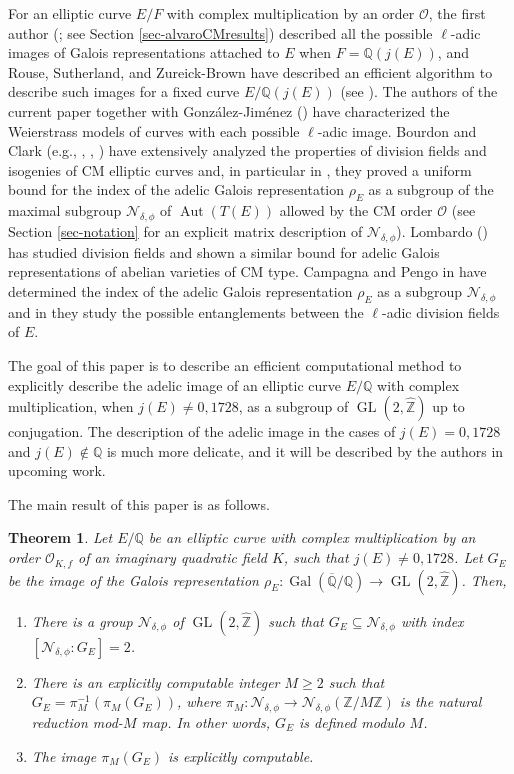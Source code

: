 \documentclass[11pt]{amsart}
\newtheorem{thm}[defn]{Theorem}
\theoremstyle{definition}
\newcommand{\Q}{\mathbb{Q}}
\newcommand{\Z}{\mathbb{Z}}
\newcommand{\Of}{\mathcal{O}_{K,f}}
\newcommand{\OO}{\mathcal{O}}
\newcommand{\Rats}{\mathbb{Q}}
\newcommand{\Gal}{\operatorname{Gal}}
\newcommand{\Aut}{\operatorname{Aut}}
\newcommand{\GQ}{\Gal(\overline{\Rats}/\Rats)}
\newcommand{\GL}{\operatorname{GL}}
\begin{document}
For an elliptic curve $E/F$ with complex multiplication by an order $\OO$, the first author (\cite{lozano-galoiscm}; see Section \ref{sec-alvaroCMresults}) described all the possible $\ell$-adic images of Galois representations attached to $E$ when $F=\Q(j(E))$, and  Rouse, Sutherland, and Zureick-Brown have described an efficient algorithm to describe such images for a fixed curve $E/\Q(j(E))$ (see \cite[Section 12]{elladic}). The authors of the current paper together with Gonz\'alez-Jim\'enez (\cite{modelspaper}) have characterized the Weierstrass models of curves with each possible $\ell$-adic image. Bourdon and Clark (e.g., \cite{bourdon2},
\cite{bourdon}, \cite{bourdon4}) have extensively analyzed the properties of division fields and isogenies of CM elliptic curves and, in particular in  \cite[Cor. 1.5]{bourdon2}, they proved a uniform bound for the  index of the adelic Galois representation $\rho_E$ as a subgroup of the maximal subgroup $\mathcal{N}_{\delta,\phi}$ of $\Aut(T(E))$ allowed by the CM order $\OO$ (see Section \ref{sec-notation} for an explicit matrix description of $\mathcal{N}_{\delta,\phi}$). Lombardo (\cite{lombardo}) has studied division fields and shown a similar bound for adelic Galois representations of abelian varieties of CM type. Campagna and Pengo in \cite{CampagnaPengo2}  have determined the index of the adelic Galois representation $\rho_E$ as a subgroup  $\mathcal{N}_{\delta,\phi}$   and in \cite{CampagnaPengo1}  they study the possible entanglements between the $\ell$-adic division fields of $E$. 

The goal of this paper is to describe an efficient computational method to explicitly describe the adelic image of an elliptic curve $E/\Q$ with complex multiplication, when $j(E)\neq 0,1728$, as a subgroup of $\GL(2,\widehat{\Z})$ up to conjugation. The description of the adelic image in the cases of $j(E)=0,1728$ and $j(E)\not\in\Q$ is much more delicate, and it will be described by the authors in upcoming work. 

The main result of this paper is as follows.

\begin{thm}\label{main-result}
    Let $E/\Q$ be an elliptic curve with complex multiplication by an order $\Of$ of an imaginary quadratic field $K$, such that $j(E)\neq 0,1728$. Let $G_E$ be the image of the Galois representation $\rho_E\colon \GQ\to \GL(2,\widehat{\Z})$. Then,
    \begin{enumerate}
        \item There is a group $\mathcal{N}_{\delta,\phi}$ of $\GL(2,\widehat{\Z})$ such that $G_E\subseteq\mathcal{N}_{\delta,\phi}$ with index $[\mathcal{N}_{\delta,\phi}:G_E]=2$. 
        \item There is an explicitly computable integer $M\geq 2$ such that $G_E=\pi_M^{-1}(\pi_M(G_E))$, where $\pi_M\colon \mathcal{N}_{\delta,\phi}\to \mathcal{N}_{\delta,\phi}(\Z/M\Z)$ is the natural reduction mod-$M$ map. In other words, $G_E$ is defined modulo $M$.
        \item The image $\pi_M(G_E)$ is explicitly computable.
    \end{enumerate}
\end{thm}
\end{document}
